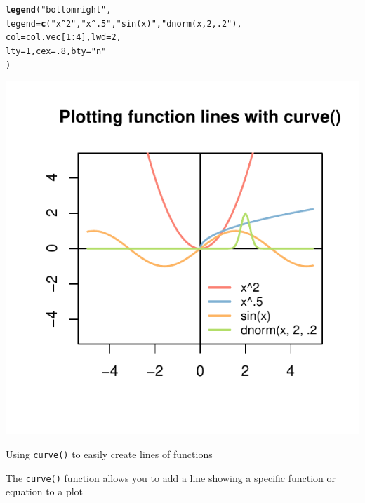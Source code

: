 \documentclass{tufte-book}\usepackage[]{graphicx}\usepackage[]{color}
\makeatletter
\def\maxwidth{ %
  \ifdim\Gin@nat@width>\linewidth
    \linewidth
  \else
    \Gin@nat@width
  \fi
}
\newcommand{\hlnum}[1]{\textcolor[rgb]{0.686,0.059,0.569}{#1}}%
\newcommand{\hlstr}[1]{\textcolor[rgb]{0.192,0.494,0.8}{#1}}%
\newcommand{\hlopt}[1]{\textcolor[rgb]{0,0,0}{#1}}%
\newcommand{\hlstd}[1]{\textcolor[rgb]{0.345,0.345,0.345}{#1}}%
\newcommand{\hlkwc}[1]{\textcolor[rgb]{0.333,0.667,0.333}{#1}}%
\newcommand{\hlkwd}[1]{\textcolor[rgb]{0.737,0.353,0.396}{\textbf{#1}}}%
\newenvironment{kframe}{%
 \def\at@end@of@kframe{}%
 \ifinner\ifhmode%
  \def\at@end@of@kframe{\end{minipage}}%
  \begin{minipage}{\columnwidth}%
 \fi\fi%
 \def\FrameCommand##1{\hskip\@totalleftmargin \hskip-\fboxsep
 \colorbox{shadecolor}{##1}\hskip-\fboxsep
     \hskip-\linewidth \hskip-\@totalleftmargin \hskip\columnwidth}%
 \MakeFramed {\advance\hsize-\width
   \@totalleftmargin\z@ \linewidth\hsize
   \@setminipage}}%
 {\par\unskip\endMakeFramed%
 \at@end@of@kframe}
\newenvironment{knitrout}{}{} %
\makeatother
\begin{document}
\begin{marginfigure}
\begin{tiny}
\begin{knitrout}
\begin{kframe}
\begin{alltt}
\hlkwd{legend}\hlstd{(}\hlstr{"bottomright"}\hlstd{,}
       \hlkwc{legend} \hlstd{=} \hlkwd{c}\hlstd{(}\hlstr{"x^2"}\hlstd{,} \hlstr{"x^.5"}\hlstd{,} \hlstr{"sin(x)"}\hlstd{,} \hlstr{"dnorm(x, 2, .2"}\hlstd{),}
       \hlkwc{col} \hlstd{= col.vec[}\hlnum{1}\hlopt{:}\hlnum{4}\hlstd{],} \hlkwc{lwd} \hlstd{=} \hlnum{2}\hlstd{,}
       \hlkwc{lty} \hlstd{=} \hlnum{1}\hlstd{,} \hlkwc{cex} \hlstd{=} \hlnum{.8}\hlstd{,} \hlkwc{bty} \hlstd{=} \hlstr{"n"}
       \hlstd{)}
\end{alltt}
\end{kframe}
\includegraphics[width=\maxwidth]{figure/unnamed-chunk-217-1} 

\end{knitrout}
\end{tiny}
\caption{Using \texttt{curve()} to easily create lines of functions}
\label{fig:functionlines}
\end{marginfigure}


The \texttt{curve()} function allows you to add a line showing a specific function or equation to a plot
\end{document}
